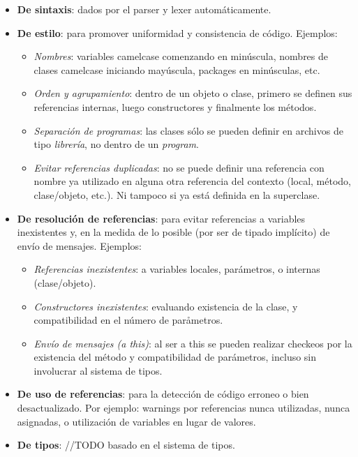\begin{itemize}
  \item \textbf{De sintaxis}: dados por el parser y lexer automáticamente.
  \item \textbf{De estilo}: para promover uniformidad y consistencia de código.
  Ejemplos:
  		\begin{itemize}
  			\item \textit{Nombres}: variables camelcase comenzando en minúscula,
  			nombres de clases camelcase iniciando mayúscula, packages en minúsculas, etc.
  			\item \textit{Orden y agrupamiento}: dentro de un objeto o clase, primero
  			se definen sus referencias internas, luego constructores y finalmente los métodos.
  			\item \textit{Separación de programas}: las clases sólo se pueden definir
  			en archivos de tipo \textit{librería}, no dentro de un \textit{program}.
  			\item \textit{Evitar referencias duplicadas}: no se puede definir una
  			referencia con nombre ya utilizado en alguna otra referencia del contexto (local, método,
  			clase/objeto, etc.). Ni tampoco si ya está definida en la superclase.
		\end{itemize}
  \item \textbf{De resolución de referencias}: para evitar referencias a
  variables inexistentes y, en la medida de lo posible (por ser de tipado
  implícito) de envío de mensajes. Ejemplos:
  		\begin{itemize}
		  \item \textit{Referencias inexistentes}: a variables locales, parámetros, o
		  internas (clase/objeto).
		  \item \textit{Constructores inexistentes}: evaluando existencia de la
		  clase, y compatibilidad en el número de paråmetros.
		  \item \textit{Envío de mensajes (a this)}: al ser a this se pueden realizar
		  checkeos por la existencia del método y compatibilidad de parámetros, incluso sin
		  involucrar al sistema de tipos.
		\end{itemize}
  \item \textbf{De uso de referencias}: para la detección de código
  	erroneo o bien desactualizado. Por ejemplo: warnings por referencias nunca
 	utilizadas, nunca asignadas, o utilización de variables en lugar de valores.
  \item \textbf{De tipos}: //TODO basado en el sistema de tipos.
\end{itemize}



